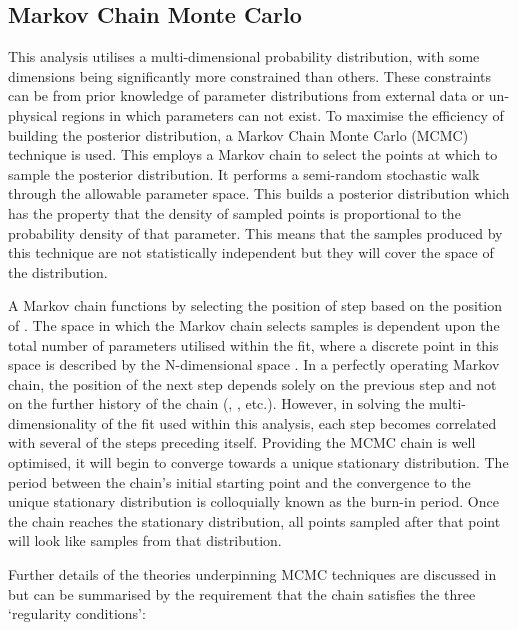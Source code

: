 \subsection{Markov Chain Monte Carlo}
\label{sec:MarkovChainMonteCarlo_MarkovChainMC}
This analysis utilises a multi-dimensional probability distribution, with some dimensions being significantly more constrained than others. These constraints can be from prior knowledge of parameter distributions from external data or un-physical regions in which parameters can not exist. To maximise the efficiency of building the posterior distribution, a Markov Chain Monte Carlo (MCMC) technique is used. This employs a Markov chain to select the points at which to sample the posterior distribution. It performs a semi-random stochastic walk through the allowable parameter space. This builds a posterior distribution which has the property that the density of sampled points is proportional to the probability density of that parameter. This means that the samples produced by this technique are not statistically independent but they will cover the space of the distribution.

A Markov chain functions by selecting the position of step  based on the position of . The space in which the Markov chain selects samples is dependent upon the total number of parameters utilised within the fit, where a discrete point in this space is described by the N-dimensional space . In a perfectly operating Markov chain, the position of the next step depends solely on the previous step and not on the further history of the chain (, , etc.). However, in solving the multi-dimensionality of the fit used within this analysis, each step becomes correlated with several of the steps preceding itself.
Providing the MCMC chain is well optimised, it will begin to converge towards a unique stationary distribution. The period between the chain's initial starting point and the convergence to the unique stationary distribution is colloquially known as the burn-in period.
Once the chain reaches the stationary distribution, all points sampled after that point will look like samples from that distribution.

Further details of the theories underpinning MCMC techniques are discussed in \cite{mcmc_practice} but can be summarised by the requirement that the chain satisfies the three `regularity conditions':

